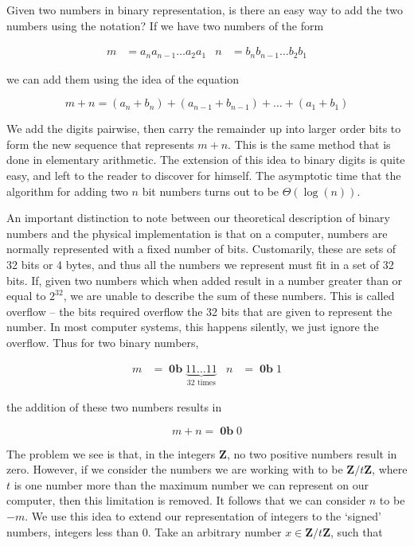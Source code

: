 \documentclass{report}
\DeclareMathOperator{\bin}{\mathbf{0b}}
\begin{document}
Given two numbers in binary representation, is there an easy way to add the two numbers using the notation? If we have two numbers of the form

\begin{align*}
    m &= a_n a_{n-1} \dots a_2 a_1 & n &= b_n b_{n-1} \dots b_2 b_1
\end{align*}

we can add them using the idea of the equation

\[ m + n = (a_n + b_n) + (a_{n-1} + b_{n-1}) + \dots + (a_1 + b_1) \]

We add the digits pairwise, then carry the remainder up into larger order bits to form the new sequence that represents $m + n$. This is the same method that is done in elementary arithmetic. The extension of this idea to binary digits is quite easy, and left to the reader to discover for himself. The asymptotic time that the algorithm for adding two $n$ bit numbers turns out to be $\Theta(\log(n))$.

An important distinction to note between our theoretical description of binary numbers and the physical implementation is that on a computer, numbers are normally represented with a fixed number of bits. Customarily, these are sets of 32 bits or 4 bytes, and thus all the numbers we represent must fit in a set of 32 bits. If, given two numbers which when added result in a number greater than or equal to $2^{32}$, we are unable to describe the sum of these numbers. This is called overflow -- the bits required overflow the 32 bits that are given to represent the number. In most computer systems, this happens silently, we just ignore the overflow. Thus for two binary numbers,

\begin{align*}
    m &= \bin \underbrace{11\dots11}_\text{32 times} & n &= \bin 1
\end{align*}

\noindent the addition of these two numbers results in

\[ m + n = \bin 0 \]

The problem we see is that, in the integers $\mathbf{Z}$, no two positive numbers result in zero. However, if we consider the numbers we are working with to be $\mathbf{Z}/t\mathbf{Z}$, where $t$ is one number more than the maximum number we can represent on our computer, then this limitation is removed. It follows that we can consider $n$ to be $-m$. We use this idea to extend our representation of integers to the `signed' numbers, integers less than 0. Take an arbitrary number $x \in \mathbf{Z}/t\mathbf{Z}$, such that
\end{document}
